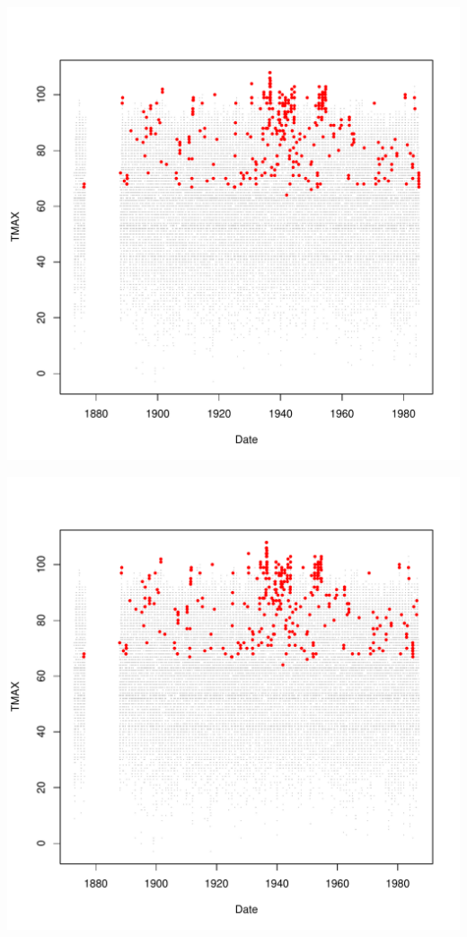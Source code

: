 \documentclass{article}\usepackage[]{graphicx}\usepackage[]{color}
\makeatletter
\def\maxwidth{ %
  \ifdim\Gin@nat@width>\linewidth
    \linewidth
  \else
    \Gin@nat@width
  \fi
}
\newenvironment{knitrout}{}{} %
\makeatother
\begin{document}
\begin{knitrout}
\includegraphics[width=\maxwidth]{figure/unnamed-chunk-4-52} 

\includegraphics[width=\maxwidth]{figure/unnamed-chunk-4-53} 


\end{knitrout}
\end{document}
